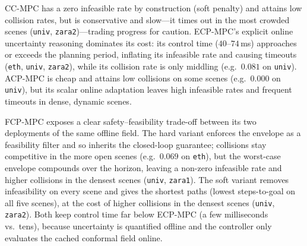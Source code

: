 \documentclass[lettersize,journal]{IEEEtran}
\begin{document}
CC-MPC has a zero infeasible rate by construction (soft penalty) and attains low collision
rates, but is conservative and slow---it times out in the most crowded scenes
(\texttt{univ}, \texttt{zara2})---trading progress for caution.
ECP-MPC's explicit online uncertainty reasoning dominates its cost: its control time
($40$--$74$\,ms) approaches or exceeds the planning period, inflating its infeasible rate
and causing timeouts (\texttt{eth}, \texttt{univ}, \texttt{zara2}), while its collision
rate is only middling (e.g.\ $0.081$ on \texttt{univ}).
ACP-MPC is cheap and attains low collisions on some scenes (e.g.\ $0.000$ on \texttt{univ}),
but its scalar online adaptation leaves high infeasible rates and frequent timeouts in dense,
dynamic scenes.

FCP-MPC exposes a clear safety--feasibility trade-off between its two deployments of the
same offline field. The hard variant enforces the envelope as a feasibility filter and so
inherits the closed-loop guarantee; collisions stay competitive in the more open scenes
(e.g.\ $0.069$ on \texttt{eth}), but the worst-case envelope compounds over the horizon,
leaving a non-zero infeasible rate and higher collisions in the densest scenes
(\texttt{univ}, \texttt{zara1}). The soft variant removes infeasibility on
every scene and gives the shortest paths (lowest steps-to-goal on all five scenes), at the
cost of higher collisions in the densest scenes (\texttt{univ}, \texttt{zara2}). Both keep
control time far below ECP-MPC (a few milliseconds vs.\ tens), because uncertainty is
quantified offline and the controller only evaluates the cached conformal field online.

\begin{table}[!t]
\centering
\small
\caption{2D navigation results on ETH--UCY pedestrian datasets.
All metrics are averaged across scenes; lower is better.
The FCP-MPC (hard) and FCP-MPC (soft) rows use our core method with the
\emph{offline-conformalized} envelope, so all methods are compared like-for-like;
the optional online adaptation (AFCP)~\eqref{eq:acp_update} is isolated in the
ablation of Table~\ref{tab:2d_ablation}.}
\label{tab:2d_results}

\end{table}

\begin{table}[!t]
\centering
\footnotesize
\setlength{\tabcolsep}{4pt}
\caption{Ablation of the online envelope adaptation~\eqref{eq:acp_update} in 2D.
Within each constraint mode (Hard / Soft), the better value per metric is in bold.
Lower values indicate better performance.}
\label{tab:2d_ablation}

\end{table}
\end{document}
